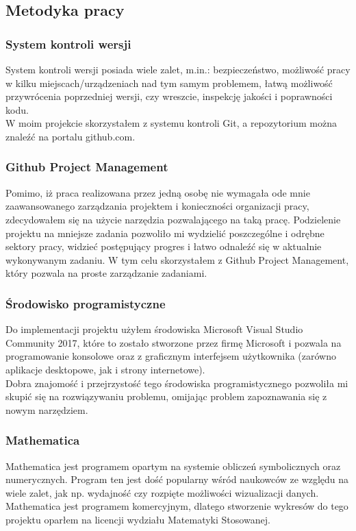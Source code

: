 \documentclass[twoside]{projektInzynierskiMS1}
\newcommand{\si}{ś}
\begin{document}
	\subsection{Metodyka pracy}
	\subsubsection{System kontroli wersji}
	System kontroli wersji posiada wiele zalet, m.in.: bezpieczeństwo, możliwo\si ć pracy w kilku miejscach/urządzeniach nad tym samym problemem, łatwą możliwo\si ć przywrócenia poprzedniej wersji, czy wreszcie, inspekcję jako\si ci i poprawno\si ci kodu. \\
W moim projekcie skorzystałem z systemu kontroli Git, a repozytorium można znaleźć na portalu github.com. 
	\subsubsection{Github Project Management}
Pomimo, iż praca realizowana przez jedną osobę nie wymagała ode mnie zaawansowanego zarządzania projektem i konieczno\si ci organizacji pracy, zdecydowałem się na użycie narzędzia pozwalającego na taką pracę. Podzielenie projektu na mniejsze zadania pozwoliło mi wydzielić poszczególne i odrębne sektory pracy, widzieć postępujący progres i łatwo odnaleźć się w aktualnie wykonywanym zadaniu. W tym celu skorzystałem z Github Project Management, który pozwala na proste zarządzanie zadaniami.
	\subsubsection{Środowisko programistyczne}
Do implementacji projektu użyłem \si rodowiska Microsoft Visual Studio Community 2017, które to zostało stworzone przez firmę Microsoft i pozwala na programowanie konsolowe oraz z graficznym interfejsem użytkownika (zarówno aplikacje desktopowe, jak i strony internetowe).  \\
Dobra znajomo\si ć i przejrzysto\si ć tego \si rodowiska programistycznego pozwoliła mi skupić się na rozwiązywaniu problemu, omijając problem zapoznawania się z nowym narzędziem.
	\subsubsection{Mathematica}
	Mathematica jest programem opartym na systemie obliczeń symbolicznych oraz numerycznych. Program ten jest do\si ć popularny w\si ród naukowców ze względu na wiele zalet, jak np. wydajno\si ć czy rozpięte możliwo\si ci wizualizacji danych. Mathematica jest programem komercyjnym, dlatego stworzenie wykresów do tego projektu oparłem na licencji wydziału Matematyki Stosowanej.
\end{document}
